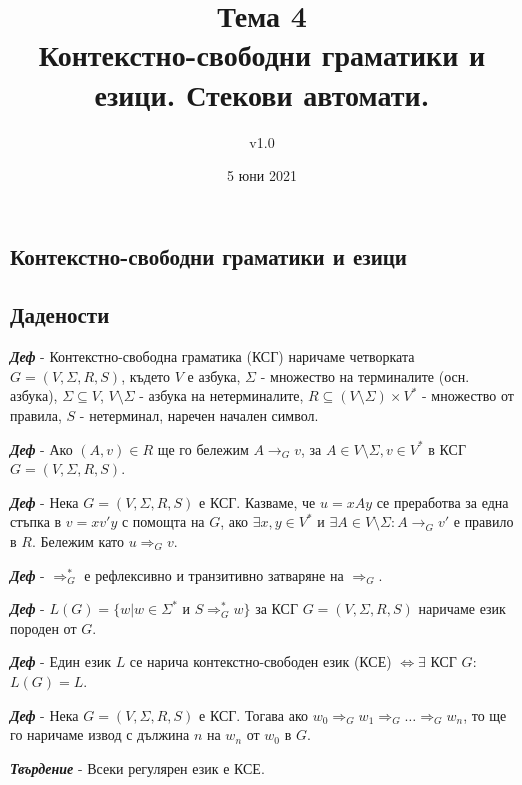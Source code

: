 \documentclass[fleqn,12pt]{article}
\title{Тема 4\\ Контекстно-свободни граматики и езици. Стекови автомати.}
\author{v1.0}
\date{5 юни 2021}
\begin{document}
\maketitle

\tableofcontents
\pagebreak
\begin{flushleft}

\section{Контекстно-свободни граматики и езици}
\subsection{Дадености}

\textit{\textbf{Деф}} - Контекстно-свободна граматика (КСГ) наричаме четворката $G = (V, \Sigma, R, S)$, където $V$ е азбука, $\Sigma$ - множество на терминалите (осн. азбука), $\Sigma \subseteq V$, $V \setminus \Sigma$ - азбука на нетерминалите, $R \subseteq (V \setminus \Sigma) \times V^*$ - множество от правила, $S$ - нетерминал, наречен начален символ.

\textit{\textbf{Деф}} - Ако $(A, v) \in R$ ще го бележим $A \to_G v$, за $A \in V \setminus \Sigma, v \in V^*$ в КСГ $G=(V, \Sigma, R, S)$.

\textit{\textbf{Деф}} - Нека $G = (V, \Sigma, R, S)$ е КСГ. Казваме, че $u = xAy$ се преработва за една стъпка в $v = xv'y$ с помощта на $G$, ако $\exists x, y \in V^*$ и $\exists A \in V \setminus \Sigma: A \to_G v'$ е правило в $R$. Бележим като $u \Rightarrow_G v$.

\textit{\textbf{Деф}} - $\Rightarrow_G^*$ е рефлексивно и транзитивно затваряне на $\Rightarrow_G$.

\textit{\textbf{Деф}} - $L(G) = \{w | w \in \Sigma^*$ и $ S \Rightarrow_G^* w\}$ за КСГ $G = (V, \Sigma, R, S)$ наричаме език породен от $G$.

\textit{\textbf{Деф}} - Един език $L$ се нарича контекстно-свободен език (КСЕ) $\iff \exists$ КСГ $G$: $L(G) = L$.

\textit{\textbf{Деф}} - Нека $G = (V, \Sigma, R, S)$ е КСГ. Тогава ако $w_0 \Rightarrow_G w_1 \Rightarrow_G \dots \Rightarrow_G w_n$, то ще го наричаме извод с дължина $n$ на $w_n$ от $w_0$ в $G$.

\textit{\textbf{Твърдение}} - Всеки регулярен език е КСЕ. 


\end{flushleft}
\end{document}

